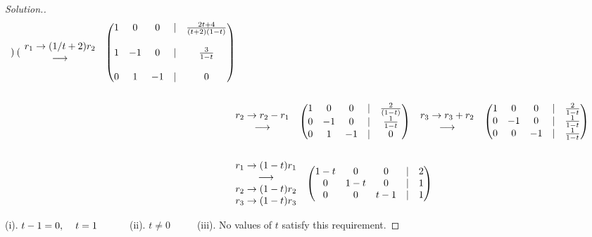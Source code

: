 \documentclass[11pt,a4paper]{article}
\theoremstyle{definition}
\newenvironment{solution}
  {\renewcommand{\qedsymbol}{}\begin{proof}[\textit{Solution}.]}
  {\end{proof}}
\begin{document}
\begin{solution}
\begin{align*}
\begin{pmatrix}
\end{pmatrix}
\hspace{0.3cm}
\begin{matrix}
r_1\rightarrow (1/t+2)r_2\\ \longrightarrow\\
\end{matrix}
\hspace{0.3cm}
\begin{pmatrix}
1&0&0&|&\frac{2t+4}{(t+2)(1-t)}\\\\1&-1&0&|&\frac{3}{1-t}\\\\ 0&1&-1&|&0\\
\end{pmatrix}\\\\
&
\begin{matrix}
r_2\rightarrow r_2-r_1\\ \longrightarrow\\
\end{matrix}
\hspace{0.3cm}
\begin{pmatrix}
1&0&0&|&\frac{2}{(1-t)}\\0&-1&0&|&\frac{1}{1-t}\\0&1&-1&|&0\\
\end{pmatrix}
\hspace{0.3cm}
\begin{matrix}
r_3\rightarrow r_3+r_2\\ \longrightarrow\\
\end{matrix}
\hspace{0.3cm}
\begin{pmatrix}
1&0&0&|&\frac{2}{1-t}\\0&-1&0&|&\frac{1}{1-t}\\0&0&-1&|&\frac{1}{1-t}\\
\end{pmatrix}\\\\
&
\begin{matrix}
r_1\rightarrow (1-t)r_1\\ \longrightarrow\\ r_2\rightarrow (1-t)r_2\\ r_3\rightarrow (1-t)r_3\\
\end{matrix}
\hspace{0.3cm}
\begin{pmatrix}
1-t&0&0&|&2\\0&1-t&0&|&1\\0&0&t-1&|&1\\
\end{pmatrix}
\end{align*}

(i). $t-1=0,\hspace{0.4cm} t=1\hspace{1cm}$ (ii). $t\neq 0\hspace{1cm}$ (iii). No values of $t$ satisfy this requirement.


\pagebreak
\end{solution}
\end{document}
